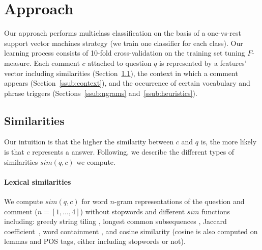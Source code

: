 \section{Approach}
\label{sec:approach}

Our approach performs multiclass classification on the basis of a one-vs-rest 
support vector machines strategy (\ie we train one classifier for each class). 
Our learning process consists of 10-fold cross-validation on the training set 
tuning $F$-measure. 
\blue{\ldots} 
Each comment $c$ attached to question $q$ is represented by a features' vector 
including similarities (Section~\ref{ssub:sim}), the context in which a comment 
appears (Section~\ref{ssub:context}), and the occurrence of certain vocabulary 
and phrase triggers (Sections~\ref{ssub:ngrams} and~\ref{ssub:heuristics}). 


% 

\subsection{Similarities}
\label{ssub:sim}

Our intuition is that the higher the similarity between $c$ and $q$ is, the 
more likely is that $c$ represents a \good answer. Following, we describe the 
different types of similarities $sim(q,c)$ we compute.

\paragraph{Lexical similarities}
We compute $sim(q, c)$ for word $n$-gram representations of the question and 
comment ($n=[1,\ldots,4]$) without stopwords and different $sim$ functions including: greedy 
string tiling \cite{Wise:1996}, longest common subsequences \cite{Allison:1986}, Jaccard 
coefficient~\cite{Jaccard:1901}, word containment \cite{Lyon:2001}, and cosine similarity 
(cosine is also computed on lemmas and POS tags, either including stopwords or 
not).

